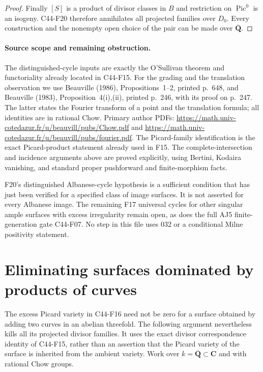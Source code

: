\documentclass[11pt]{article}
\theoremstyle{remark}\newtheorem{remark}[theorem]{Remark}
\begin{document}
\begin{proof}
Finally $[S]$ is a product of divisor classes in
$B$ and restriction on $\operatorname{Pic}^0$
is an isogeny.  C44-F20 therefore annihilates
all projected families over $D_0$.
Every construction and the nonempty open choice
of the pair can be made over $\overline{\mathbf Q}$.
\end{proof}

\paragraph{Source scope and remaining obstruction.}
The distinguished-cycle inputs are exactly the
O'Sullivan theorem and functoriality already
located in C44-F15.  For the grading and the
translation observation we use Beauville (1986),
Propositions~1--2, printed p.~648, and Beauville
(1983), Proposition~4(i),(ii), printed p.~246,
with its proof on p.~247.  The latter states the
Fourier transform of a point and the translation
formula; all identities are in rational Chow.
Primary author PDFs:
\url{https://math.univ-cotedazur.fr/u/beauvill/pubs/Chow.pdf}
and
\url{https://math.univ-cotedazur.fr/u/beauvill/pubs/fourier.pdf}.
The Picard-family identification is the exact
Picard-product statement already used in F15.
The complete-intersection and incidence arguments
above are proved explicitly, using Bertini,
Kodaira vanishing, and standard proper
pushforward and finite-morphism facts.

F20's distinguished Albanese-cycle hypothesis
is a sufficient condition that has just been
verified for a specified class of image surfaces.
It is not asserted for every Albanese image.
The remaining F17 universal cycles for other
singular ample surfaces with excess irregularity
remain open, as does the full AJ5 finite-generation
gate C44-F07.  No step in this file uses 032 or a
conditional Milne positivity statement.



\section{Eliminating surfaces dominated by products of curves}

The excess Picard variety in C44-F16 need not be zero for a
surface obtained by adding two curves in an abelian threefold.
The following argument nevertheless kills all its projected
divisor families.  It uses the exact divisor correspondence
identity of C44-F15, rather than an assertion that the Picard
variety of the surface is inherited from the ambient variety.
Work over $k=\overline{\mathbf Q}\subset\mathbf C$ and with
rational Chow groups.
\end{document}
